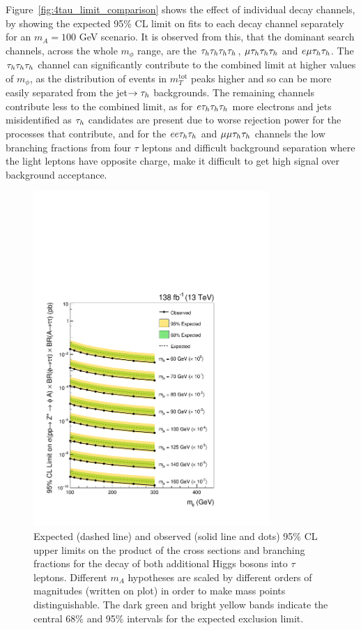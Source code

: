 Figure~\ref{fig:4tau_limit_comparison} shows the effect of individual decay channels, by showing the expected 95\% \ac{CL} limit on fits to each decay channel separately for an $m_{A} = 100$ GeV scenario.
It is observed from this, that the dominant search channels, across the whole $m_{\phi}$ range, are the $\tau_{h}\tau_{h}\tau_{h}\tau_{h}$, $\mu\tau_{h}\tau_{h}\tau_{h}$ and $e\mu\tau_{h}\tau_{h}$.
The $\tau_{h}\tau_{h}\tau_{h}$ channel can significantly contribute to the combined limit at higher values of $m_{\phi}$, as the distribution of events in $m_{T}^{\text{tot}}$ peaks higher and so can be more easily separated from the jet$\rightarrow\tau_{h}$ backgrounds.
The remaining channels contribute less to the combined limit, as for $e\tau_{h}\tau_{h}\tau_{h}$ more electrons and jets misidentified as $\tau_{h}$ candidates are present due to worse rejection power for the processes that contribute, and for the $ee\tau_{h}\tau_{h}$ and $\mu\mu\tau_{h}\tau_{h}$ channels the low branching fractions from four $\tau$ leptons and difficult background separation where the light leptons have opposite charge, make it difficult to get high signal over background acceptance.

\begin{figure}[!hbtp]
\centering
    \includegraphics[width=0.8\textwidth]{Figures/model_independent_limit_all.pdf}
\caption{Expected (dashed line) and observed (solid line and dots) 95\% CL upper limits on the product of the cross sections and branching fractions for the decay of both additional Higgs bosons into $\tau$ leptons. Different $m_{A}$ hypotheses are scaled by different orders of magnitudes (written on plot) in order to make mass points distinguishable. The dark green and bright yellow bands indicate the central 68\% and 95\% intervals for the expected exclusion limit.}
\label{fig:4tau_mi}
\end{figure}

